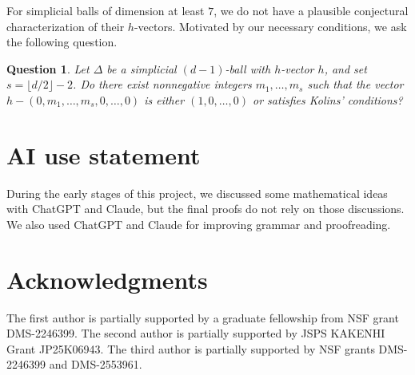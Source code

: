 \documentclass[11pt]{article}
\newtheorem{question}[theorem]{Question}
\theoremstyle{definition}
\numberwithin{equation}{theorem}
\begin{document}
For simplicial balls of dimension at least $7$, we do not have a plausible conjectural characterization of their $h$-vectors. Motivated by our necessary conditions, we ask the following question.
\begin{question}
Let $\Delta$ be a simplicial $(d-1)$-ball with $h$-vector $h$, and set $s=\lfloor d/2\rfloor-2$. Do there exist nonnegative integers $m_1,\ldots,m_s$ such that the vector $h-(0,m_1,\ldots,m_s,0,\ldots,0)$ is either $(1,0,\ldots,0)$ or satisfies Kolins' conditions?
\end{question}

\section*{AI use statement}
During the early stages of this project, we discussed some mathematical ideas with ChatGPT and Claude, but the final proofs do not rely on those discussions. We also used ChatGPT and Claude for improving grammar and proofreading.


\section*{Acknowledgments}
The first author is partially supported by a graduate fellowship from NSF grant DMS-2246399.
The second author is partially supported by JSPS KAKENHI Grant  JP25K06943. The third author is partially supported by NSF grants DMS-2246399 and DMS-2553961.


\printbibliography
\end{document}
